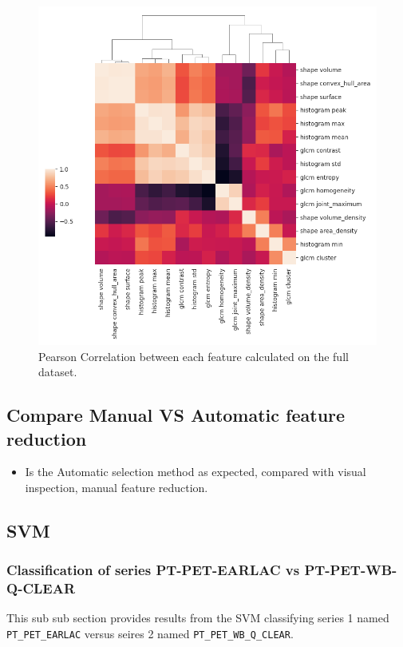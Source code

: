 \begin{figure}[H]
    \centering
    \includegraphics[width=1\textwidth]{Figures/feature_correlation.png}
    \caption{Pearson Correlation between each feature calculated on the full
    dataset. }  
    \label{fig:correlation} 
\end{figure}





\subsection{Compare Manual VS Automatic feature reduction}
\begin{itemize}
    \item Is the Automatic selection method as expected, compared with visual
        inspection, manual feature reduction.   
\end{itemize}




\subsection{SVM}

\subsubsection{Classification of series PT-PET-EARLAC vs PT-PET-WB-Q-CLEAR}
\label{sec:SVM0}
This sub sub section provides results from the SVM classifying series 1 named \verb|PT_PET_EARLAC|
versus seires 2 named \verb|PT_PET_WB_Q_CLEAR|. 

